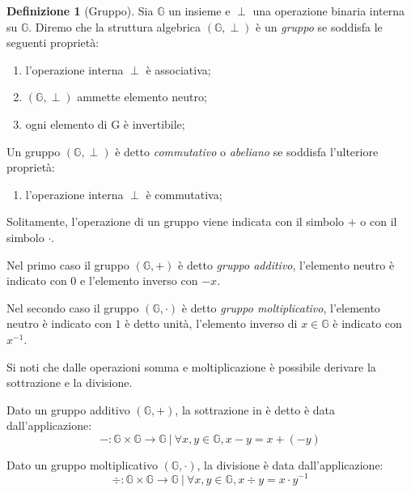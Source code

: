 \documentclass{book}
\theoremstyle{definition}
\newtheorem{definizione}{Definizione}
\newcommand{\Gr}{\mathbb{G}}
\newcommand{\per}{\cdot}
\begin{document}
\begin{definizione}[Gruppo]
    Sia $\Gr$ un insieme e $\perp$ una operazione binaria interna su $\Gr$. 
    Diremo che la struttura algebrica $(\Gr, \perp)$ è un \emph{gruppo} se soddisfa le seguenti proprietà:
    \begin{enumerate}[label=(G\arabic*.),itemindent=*]
        \item l'operazione interna $\perp$ è associativa;
        \item $(\Gr, \perp)$ ammette elemento neutro;
        \item ogni elemento di G è invertibile;
    \end{enumerate}
    \medskip
    Un gruppo $(\Gr, \perp)$ è detto \emph{commutativo} o \emph{abeliano} se soddisfa l'ulteriore proprietà:
    \medskip
    \begin{enumerate}[label=(G\arabic*.),itemindent=*, resume]
        \item l'operazione interna $\perp$ è commutativa;
    \end{enumerate}
\end{definizione}


Solitamente, l'operazione di un gruppo viene indicata con il simbolo $+$ o con il simbolo $\cdot$.

\medskip

Nel primo caso il gruppo $(\Gr, +)$ è detto \emph{gruppo additivo}, 
l'elemento neutro è indicato con $0$ e l'elemento inverso con $-x$. 

\medskip

Nel secondo caso il gruppo $(\Gr, \cdot)$ è detto \emph{gruppo moltiplicativo}, 
l'elemento neutro è indicato con $1$ è detto unità, l'elemento inverso di $x \in \Gr$ è indicato con $x^{-1}$.

\begin{displayquote}
Si noti che dalle operazioni somma e moltiplicazione è possibile derivare la sottrazione e la divisione.

\medskip

Dato un gruppo additivo $(\Gr, +)$, la sottrazione in è detto è data dall'applicazione: 
\[ 
-: \Gr \times \Gr \rightarrow \Gr \ | \ \forall x, y \in \Gr, x - y = x + (-y) 
\]

Dato un gruppo moltiplicativo $(\Gr, \cdot)$, la divisione è data dall'applicazione:
\[ 
\div: \Gr \times \Gr \rightarrow \Gr \ | \ \forall x, y \in \Gr, x \div y = x \per y^{-1} 
\]

\end{displayquote}
\end{document}
